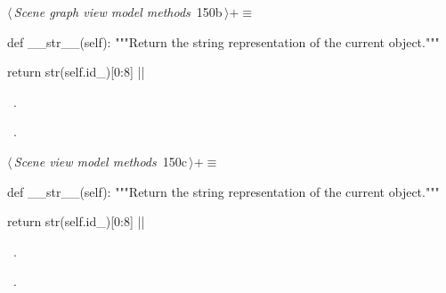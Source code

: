 \documentclass[%
    a4paper,    %
    justified,  %
    nobib,      %
    openany     %
]{tufte-book}
\begin{document}
\begin{flushleft} \small
\begin{minipage}{\linewidth}\label{scrap171}\raggedright\small
{} $\langle\,${\itshape Scene graph view model methods}\nobreak\ {\footnotesize {150b}}$\,\rangle+\equiv$
\vspace{-1ex}
\begin{pythoncode}
def __str__(self):
    """Return the string representation of the current object."""

    return str(self.id_)[0:8]
|\NWsep|
\end{pythoncode}
\vspace{1.5ex}
\footnotesize
\begin{list}{}{\setlength{\itemsep}{-\parsep}\setlength{\itemindent}{-\leftmargin}}
\item \NWtxtMacroDefBy\ .
\item \NWtxtMacroRefIn\ .

\item{}
\end{list}
\end{minipage}\vspace{4ex}
\end{flushleft}
\begin{flushleft} \small
\begin{minipage}{\linewidth}\label{scrap172}\raggedright\small
{} $\langle\,${\itshape Scene view model methods}\nobreak\ {\footnotesize {150c}}$\,\rangle+\equiv$
\vspace{-1ex}
\begin{pythoncode}
def __str__(self):
    """Return the string representation of the current object."""

    return str(self.id_)[0:8]
|\NWsep|
\end{pythoncode}
\vspace{1.5ex}
\footnotesize
\begin{list}{}{\setlength{\itemsep}{-\parsep}\setlength{\itemindent}{-\leftmargin}}
\item \NWtxtMacroDefBy\ .
\item \NWtxtMacroRefIn\ .

\item{}
\end{list}
\end{minipage}\vspace{4ex}
\end{flushleft}
\end{document}
